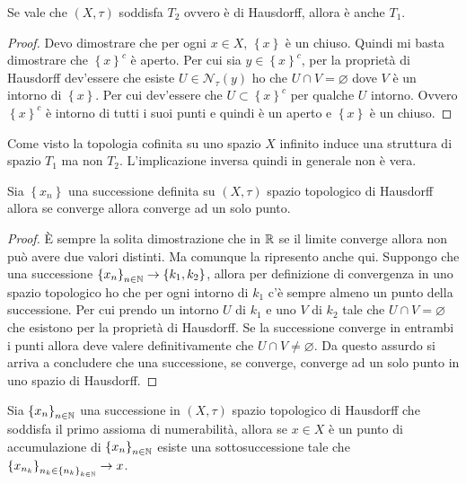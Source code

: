 \begin{theorem}
	Se vale che $(X, \tau)$ soddisfa $T_2$ ovvero è di Hausdorff, allora è anche $T_1$.
\end{theorem} 
\begin{proof}
	Devo dimostrare che per ogni $x\in X$, $\left\{x\right\}$ è un chiuso. Quindi mi basta dimostrare che $\left\{x\right\}^c$ è aperto. Per cui sia $y \in \left\{x\right\}^c$, per la proprietà di Hausdorff dev'essere che esiste $U \in \mathcal{N}_\tau(y)$ ho che $U \cap V = \varnothing$ dove $V$ è un intorno di $\left\{x\right\}$. Per cui dev'essere che $U \subset \left\{x\right\}^c$ per qualche $U$ intorno. Ovvero $\left\{x\right\}^c$ è intorno di tutti i suoi punti e quindi è un aperto e $\left\{x\right\}$ è un chiuso.
\end{proof}
\begin{remark} Come visto la topologia cofinita su uno spazio $X$ infinito induce una struttura di spazio $T_1$ ma non $T_2$. L'implicazione inversa quindi in generale non è vera.
\end{remark}
\begin{theorem}
	Sia $\left\{x_n\right\}$ una successione definita su $(X, \tau)$ spazio topologico di Hausdorff allora se converge allora converge ad un solo punto. 
\end{theorem} 
\begin{proof}
	È sempre la solita dimostrazione che in $\mathbb{R}$ se il limite converge allora non può avere due valori distinti. Ma comunque la ripresento anche qui. Suppongo che una successione $\left\{x_n\right\}_{n \in \mathbb{N}} \rightarrow \left\{k_1, k_2\right\}$, allora per definizione di convergenza in uno spazio topologico ho che per ogni intorno di $k_1$ c'è sempre almeno un punto della successione. Per cui prendo un intorno $U$ di $k_1$ e uno $V$ di $k_2$ tale che $U \cap V = \varnothing$ che esistono per la proprietà di Hausdorff. Se la successione converge in entrambi i punti allora deve valere definitivamente che $U \cap V \neq \varnothing$. Da questo assurdo si arriva a concludere che una successione, se converge, converge ad un solo punto in uno spazio di Hausdorff. 
\end{proof}

\begin{theorem}
	Sia $\left\{x_n\right\}_{n\in \mathbb{N}}$ una successione in $(X,\tau)$ spazio topologico di Hausdorff che soddisfa il primo assioma di numerabilità, allora se $x \in X$ è un punto di accumulazione di $\left\{x_n\right\}_{n\in \mathbb{N}}$ esiste una sottosuccessione tale che $\left\{x_{n_k}\right\}_{n_k \in \left\{n_k\right\}_{k \in \mathbb{N}}} \rightarrow x$. 
\end{theorem}

